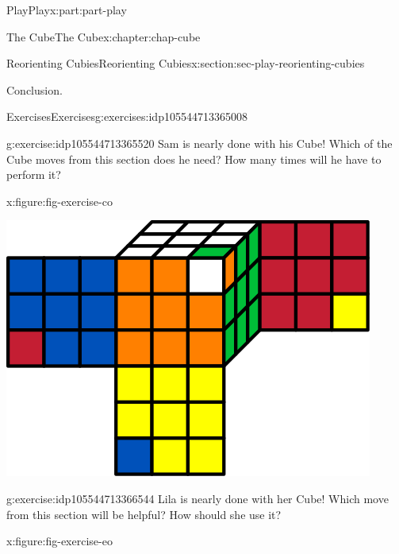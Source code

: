 \documentclass[oneside,10pt,]{book}
\numberwithin{equation}{section}
\begin{document}
\begin{partptx}{Play}{}{Play}{}{}{x:part:part-play}
\begin{chapterptx}{The Cube}{}{The Cube}{}{}{x:chapter:chap-cube}
\begin{sectionptx}{Reorienting Cubies}{}{Reorienting Cubies}{}{}{x:section:sec-play-reorienting-cubies}
\begin{conclusion}{Conclusion.}
\begin{itemize}[label=\textbullet]
\end{itemize}
%
\end{conclusion}%
%
%
\typeout{************************************************}
\typeout{************************************************}
%
\begin{exercises-subsection-numberless}{Exercises}{}{Exercises}{}{}{g:exercises:idp105544713365008}
\begin{divisionexercise}{1}{}{}{g:exercise:idp105544713365520}%
Sam is nearly done with his Cube! Which of the Cube moves from this section does he need? How many times will he have to perform it?%
\begin{figureptx}{}{x:figure:fig-exercise-co}{}%
\begin{image}{0.25}{0.5}{0.25}%
\includegraphics[width=\linewidth]{./images/co.svg}
\end{image}%
\tcblower
\end{figureptx}%
\end{divisionexercise}%
\begin{divisionexercise}{2}{}{}{g:exercise:idp105544713366544}%
Lila is nearly done with her Cube! Which move from this section will be helpful? How should she use it?%
\begin{figureptx}{}{x:figure:fig-exercise-eo}{}%
\begin{image}{0.25}{0.5}{0.25}%

\end{image}
\end{figureptx}
\end{divisionexercise}
\end{exercises-subsection-numberless}
\end{sectionptx}
\end{chapterptx}
\end{partptx}
\end{document}

